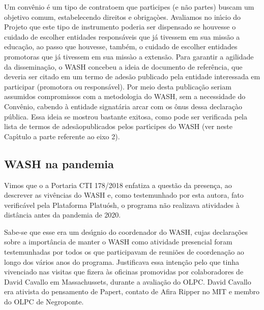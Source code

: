 \documentclass[
12pt,		%
openright,	%
twoside,  %
a4paper,			%
chapter=TITLE,		%
english,			%
french,				%
spanish,			%
brazil				%
]{USPSC-classe/USPSC}
\begin{document}
Um conv\^enio \'e um tipo de \textquotedbl contrato\textquotedbl  em que part\'{\i}cipes (e n\~ao partes) buscam um objetivo comum, estabelecendo direitos e obriga\c{c}òes. Avaliamos no in\'{\i}cio do Projeto que este tipo de instrumento poderia ser dispensado se houvesse o cuidado de escolher entidades respons\'aveis que j\'a tivessem em sua miss\~ao a educa\c{c}\~ao, ao passo que houvesse, tamb\'em, o cuidado de escolher entidades promotoras que j\'a tivessem em sua miss\`ao a extens\~ao. Para garantir a agilidade da dissemina\c{c}\~ao, o WASH concebeu a ideia de \textquotedbl documento de refer\^encia\textquotedbl , que deveria ser citado em um termo de ades\~ao publicado pela entidade interessada em participar (promotora ou respons\'avel). Por meio desta publica\c{c}\~ao seriam assumidos compromissos com a metodologia do WASH, sem a necessidade do Conv\^enio, cabendo \`a entidade signat\'aria arcar com os \^onus dessa declara\c{c}\`ao p\'ublica. Essa ideia se mostrou bastante exitosa, como pode ser verificada pela lista de \textquotedbl termos de ades\~ao\textquotedbl  publicados pelos part\'{\i}cipes do WASH (ver neste Cap\'{\i}tulo a parte referente ao eixo 2).










\subsection[WASH na pandemia]{WASH na pandemia}\label{WASH na pandemia}
Vimos que o a Portaria CTI 178/2018 enfatiza a quest\~ao da \textquotedbl presen\c{c}a\textquotedbl , ao descrever as viv\^encias do WASH e, como testemunhado por esta autora, fato verific\'avel pela Plataforma Platu\'osh, o programa n\~ao realizava atividades \`a dist\^ancia antes da pandemia de 2020.










Sabe-se que esse era um des\'{\i}gnio do coordenador do WASH, cujas declara\c{c}\~oes sobre a import\^ancia de manter o WASH como atividade presencial foram testemunhadas por todos os que participavam de reuni\~oes de coordena\c{c}\~ao ao longo dos v\'arios anos do programa. Justificava essa inten\c{c}\~ao pelo que tinha vivenciado nas visitas que fizera \`as oficinas promovidas por colaboradores de David Cavallo em Massachussets, durante a avalia\c{c}\~ao do OLPC. David Cavallo era ativista do pensamento de Papert, contato de Afira Ripper no MIT e membro do OLPC de Negroponte.
\end{document}
